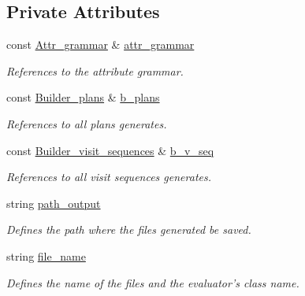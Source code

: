 \subsection*{Private Attributes}
\begin{CompactItemize}
\item 
const \hyperlink{classgenevalmag_1_1Attr__grammar}{Attr\_\-grammar} \& \hyperlink{classgenevalmag_1_1Builder__code_94e3c41b0c77596acfb34c731c17f001}{attr\_\-grammar}
\begin{CompactList}\small\item\em References to the attribute grammar. \item\end{CompactList}\item 
const \hyperlink{classgenevalmag_1_1Builder__plans}{Builder\_\-plans} \& \hyperlink{classgenevalmag_1_1Builder__code_ba5b99353b3ec17c3b788c7baa2ae4ce}{b\_\-plans}
\begin{CompactList}\small\item\em References to all plans generates. \item\end{CompactList}\item 
const \hyperlink{classgenevalmag_1_1Builder__visit__sequences}{Builder\_\-visit\_\-sequences} \& \hyperlink{classgenevalmag_1_1Builder__code_4440af64f703eb71fd4df162f39fdcc6}{b\_\-v\_\-seq}
\begin{CompactList}\small\item\em References to all visit sequences generates. \item\end{CompactList}\item 
string \hyperlink{classgenevalmag_1_1Builder__code_7e921a42176e2397ec0a34308408ab4c}{path\_\-output}
\begin{CompactList}\small\item\em Defines the path where the files generated be saved. \item\end{CompactList}\item 
string \hyperlink{classgenevalmag_1_1Builder__code_ba028c9ecb9918cd3371b2838b70a639}{file\_\-name}
\begin{CompactList}\small\item\em Defines the name of the files and the evaluator's class name. \item\end{CompactList}\end{CompactItemize}


